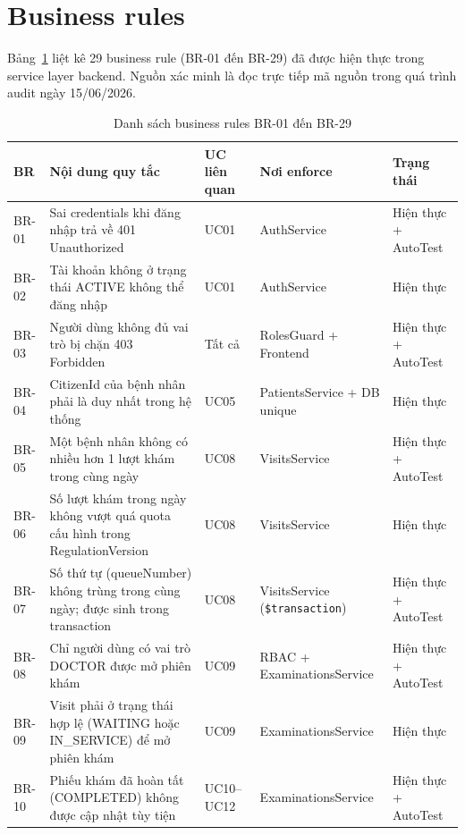 \section{Business rules}
\label{sec:srs-br}

Bảng~\ref{tab:srs-br} liệt kê 29 business rule (BR-01 đến BR-29) đã được hiện thực trong service layer backend. Nguồn xác minh là đọc trực tiếp mã nguồn trong quá trình audit ngày 15/06/2026.

\begin{longtable}{|p{1.3cm}|p{4.5cm}|p{2.0cm}|p{2.4cm}|p{2.2cm}|}
\caption{Danh sách business rules BR-01 đến BR-29}
\label{tab:srs-br}\\
\hline
\textbf{BR} & \textbf{Nội dung quy tắc} & \textbf{UC liên quan} & \textbf{Nơi enforce} & \textbf{Trạng thái} \\
\hline
\endhead
\hline
\endfoot
BR-01 & Sai credentials khi đăng nhập trả về 401 Unauthorized & UC01 & AuthService & Hiện thực + AutoTest \\
\hline
BR-02 & Tài khoản không ở trạng thái ACTIVE không thể đăng nhập & UC01 & AuthService & Hiện thực \\
\hline
BR-03 & Người dùng không đủ vai trò bị chặn 403 Forbidden & Tất cả & RolesGuard + Frontend & Hiện thực + AutoTest \\
\hline
BR-04 & CitizenId của bệnh nhân phải là duy nhất trong hệ thống & UC05 & PatientsService + DB unique & Hiện thực \\
\hline
BR-05 & Một bệnh nhân không có nhiều hơn 1 lượt khám trong cùng ngày & UC08 & VisitsService & Hiện thực + AutoTest \\
\hline
BR-06 & Số lượt khám trong ngày không vượt quá quota cấu hình trong RegulationVersion & UC08 & VisitsService & Hiện thực \\
\hline
BR-07 & Số thứ tự (queueNumber) không trùng trong cùng ngày; được sinh trong transaction & UC08 & VisitsService (\verb|$transaction|) & Hiện thực + AutoTest \\
\hline
BR-08 & Chỉ người dùng có vai trò DOCTOR được mở phiên khám & UC09 & RBAC + ExaminationsService & Hiện thực + AutoTest \\
\hline
BR-09 & Visit phải ở trạng thái hợp lệ (WAITING hoặc IN\_SERVICE) để mở phiên khám & UC09 & ExaminationsService & Hiện thực \\
\hline
BR-10 & Phiếu khám đã hoàn tất (COMPLETED) không được cập nhật tùy tiện & UC10--UC12 & ExaminationsService & Hiện thực + AutoTest \\

\end{longtable}
